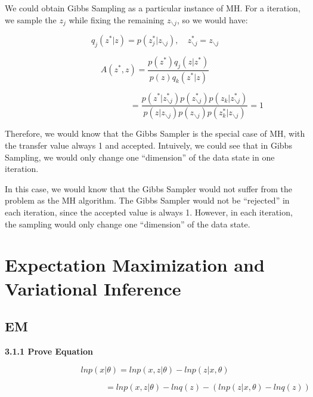\documentclass{article} %
\begin{document}
We could obtain Gibbs Sampling as a particular instance of MH. For a iteration,
we sample the $z_j$ while fixing the remaining $z_{\backslash j}$, so we would
have:

\begin{equation}
q_j (z^* | z) = p (z^*_j | z_{\backslash j}), \quad
z^*_{\backslash j} = z_{\backslash j}
\end{equation}

\begin{equation}
A (z^*, z) = \frac{p (z^*) q_j (z | z^*)}{p (z) q_k (z^* | z)}
\end{equation}

\begin{equation}
\qquad \qquad \qquad \qquad \qquad =
\frac{p (z^* | z^*_{\backslash j}) p (z^*_{\backslash j}) p (z_k | z^*_{\backslash j})}
{p (z | z_{\backslash j}) p (z_{\backslash j}) p (z^*_k | z_{\backslash j})}
= 1
\end{equation}

Therefore, we would know that the Gibbs Sampler is the special case of MH, with
the transfer value always 1 and accepted. Intuively, we could see that in Gibbs
Sampling, we would only change one ``dimension'' of the data state in one
iteration.

In this case, we would know that the Gibbs Sampler would not suffer from the
problem as the MH algorithm. The Gibbs Sampler would not be ``rejected'' in each
iteration, since the accepted value is always 1. However, in each iteration, the
sampling would only change one ``dimension'' of the data state.



\section{Expectation Maximization and Variational Inference}


\subsection{EM}

\textbf{3.1.1 Prove Equation}

\begin{equation}
ln p (x | \theta) = ln p (x,z | \theta) - ln p (z | x, \theta)
\end{equation}

\begin{equation}
\qquad \qquad \qquad \qquad \qquad \qquad =
ln p (x,z | \theta) - ln q (z) - (ln p (z | x, \theta) - ln q (z))
\end{equation}
\end{document}
